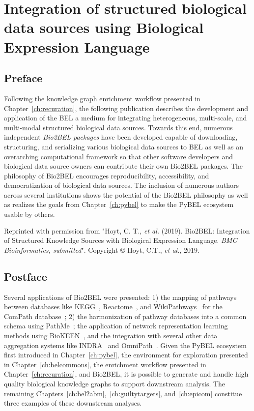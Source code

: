 \chapter{Integration of structured biological data sources using Biological Expression Language}
\label{ch:bio2bel}

\section*{Preface}

Following the knowledge graph enrichment workflow presented in Chapter~\ref{ch:recuration}, the following publication describes the development and application of the \ac{BEL} a medium for integrating heterogeneous, multi-scale, and multi-modal structured biological data sources.
Towards this end, numerous independent \textit{Bio2BEL packages} have been developed capable of downloading, structuring, and serializing various biological data sources to \ac{BEL} as well as an overarching computational framework so that other software developers and biological data source owners can contribute their own Bio2BEL packages.
The philosophy of Bio2BEL encourages reproducibility, accessibility, and democratization of biological data sources.
The inclusion of numerous authors across several institutions shows the potential of the Bio2BEL philosophy as well as realizes the goals from Chapter~\ref{ch:pybel} to make the PyBEL ecosystem usable by others.

\vspace*{\fill}

Reprinted with permission from "Hoyt, C. T., \textit{et al.} (2019). Bio2BEL: Integration of Structured Knowledge Sources with Biological Expression Language. \textit{BMC Bioinformatics, submitted}".
Copyright © Hoyt, C.T., \textit{et al.}, 2019.



\section*{Postface}

Several applications of Bio2BEL were presented: 1) the mapping of pathways between databases like \ac{KEGG}~\cite{Kanehisa2017}, Reactome~\cite{Fabregat2016}, and WikiPathways~\cite{Slenter2018} for the ComPath database~\cite{Domingo-Fernandez2018}; 2) the harmonization of pathway databases into a common schema using PathMe~\cite{Domingo-Fernandez2019a}; the application of network representation learning methods using BioKEEN~\cite{Ali2019}, and the integration with several other data aggregation systems like \ac{INDRA}~\cite{Gyori2017} and OmniPath~\cite{Turei2016}.
Given the PyBEL ecosystem first introduced in Chapter~\ref{ch:pybel}, the environment for exploration presented in Chapter~\ref{ch:belcommons}, the enrichment workflow presented in Chapter~\ref{ch:recuration}, and Bio2BEL, it is possible to generate and handle high quality biological knowledge graphs to support downstream analysis.
The remaining Chapters~\ref{ch:bel2abm},~\ref{ch:guiltytargets}, and~\ref{ch:epicom} constitue three examples of these downstream analyses.
